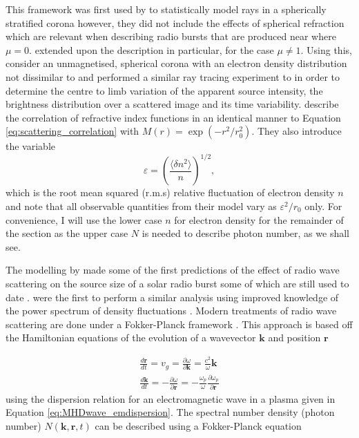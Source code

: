 This framework was first used by \cite{Fokker1965} to statistically model rays in a spherically stratified corona however, they did not include the effects of spherical refraction which are relevant when describing radio bursts that are produced near where $\mu = 0$. \cite{Hollweg1967} extended upon the \cite{Chandrasekhar1952} description in particular, for the case $\mu \neq 1$. Using this, \cite{Steinberg1971} consider an unmagnetised, spherical corona with an electron density distribution not dissimilar to \cite{Newkirk1961} and performed a similar ray tracing experiment to \cite{Fokker1965} in order to determine the centre to limb variation of the apparent source intensity, the brightness distribution over a scattered image and its time variability. \cite{Steinberg1971} describe the correlation of refractive index functions in an identical manner to Equation \ref{eq:scattering_correlation} with $M(r) =  \exp{(-r^2/r_0^2)}$. They also introduce the variable 
$$
\varepsilon =\left( \frac{\langle \delta n^2 \rangle}{n}\right)^{1/2},
$$
which is the root mean squared (r.m.s) relative fluctuation of electron density $n$ and note that all observable quantities from their model vary as $\varepsilon^2/r_0$ only. For convenience, I will use the lower case $n$ for electron density for the remainder of the section as the upper case $N$ is needed to describe photon number, as we shall see.

The modelling by \cite{Steinberg1971} made some of the first predictions of the effect of radio wave scattering on the source size of a solar radio burst some of which are still used to date \citep[e.g.][]{Chrysaphi2018}. \cite{Thejappa2007} were the first to perform a similar analysis using improved knowledge of the power spectrum of density fluctuations \citep{Coles1989}. Modern treatments of radio wave scattering are done under a Fokker-Planck framework \citep{Arzner1999, Bian2019}. This approach is based off the Hamiltonian equations of the evolution of a wavevector $\mathbf{k}$ and position $\mathbf{r}$

\begin{align}
\frac{d \mathbf{r}}{dt} = v_g = \frac{\partial \omega}{\partial \mathbf{k}} = \frac{c^2}{\omega} \mathbf{k} \label{eq:scattering_Hamiltonian_r}\\
\frac{d \mathbf{k}}{dt} = - \frac{\partial \omega}{\partial \mathbf{r}} = - \frac{\omega_p}{\omega}\frac{\partial \omega_p}{\partial \mathbf{r}} \label{eq:scattering_Hamiltonian_k}
\end{align}
using the dispersion relation for an electromagnetic wave in a plasma given in Equation \ref{eq:MHDwave_emdispersion}. The spectral number density (photon number) $N(\mathbf{k}, \mathbf{r}, t)$ can be described using a Fokker-Planck equation

